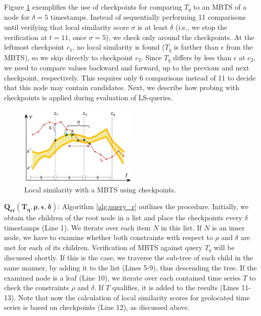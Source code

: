 Figure \ref{fig:sim_mbts_checkpoints} exemplifies the use of checkpoints for comparing $T_q$ to an MBTS of a node for $\delta=5$ timestamps. Instead of sequentially performing 11 comparisons until verifying that local similarity score $\sigma$ is at least $\delta$ (i.e., we stop the verification at $t=11$, once $\sigma=5$), we check only around the checkpoints. At the leftmost checkpoint $c_1$, no local similarity is found ($T_q$ is farther than $\epsilon$ from the MBTS), so we skip directly to checkpoint $c_2$. Since $T_q$ differs by less than $\epsilon$ at $c_2$, we need to compare values backward and forward, up to the previous and next checkpoint, respectively. This requires only 6 comparisons instead of 11 to decide that this node may contain candidates. Next, we describe how probing with checkpoints is applied during evaluation of LS-queries.

\begin{figure}[!tb]
    \centering
    \includegraphics[width=0.5\textwidth]{Figures/sim_mbts_checkpoints.png}
    \caption{Local similarity with a MBTS using checkpoints.}
    \label{fig:sim_mbts_checkpoints}
\end{figure}

\noindent $\mathbold{Q_{rr}(T_q, \rho, \epsilon, \delta)}$: Algorithm \ref{alg:query_r} outlines the procedure. Initially, we obtain the children of the root node in a list and place the checkpoints every $\delta$ timestamps (Line 1). We iterate over each item $N$ in this list. If $N$ is an inner node, we have to examine whether both constraints with respect to $\rho$ and $\delta$ are met for each of its children. Verification of MBTS against query $T_q$ will be discussed shortly. If this is the case, we traverse the sub-tree of each child in the same manner, by adding it to the list (Lines 5-9), thus descending the tree. If the examined node is a leaf (Line 10), we iterate over each contained time series $T$ to check the constraints $\rho$ and $\delta$. If $T$ qualifies, it is added to the results (Lines 11-13). Note that now the calculation of local similarity scores for geolocated time series is based on checkpoints (Line 12), as discussed above.

